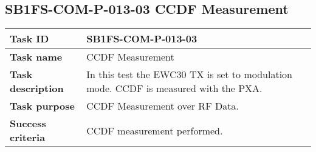 \renewcommand{\procid}{SB1FS-COM-P-013}
\renewcommand{\subprocid}{\procid-03}
\renewcommand{\procname}{CCDF Measurement}

\newpage
\subsection{\subprocid{} \procname{}}\label{sec:dataccdf}

\begin{table}[H]
	\centering
	\footnotesize
	\begin{tabular}{|L{3.0cm}|L{13.0cm}|}\hline
	 \textbf{Task ID} & \subprocid{} \\\hline
	 \textbf{Task name} & \procname \\\hline
	 \textbf{Task description} & In this test the EWC30 TX is set to modulation mode. CCDF is measured with the PXA.\\ \hline
	 \textbf{Task purpose} & CCDF Measurement over RF Data.\\\hline
	 \textbf{Success criteria} & CCDF measurement performed.\\\hline


\end{tabular}
\end{table}
